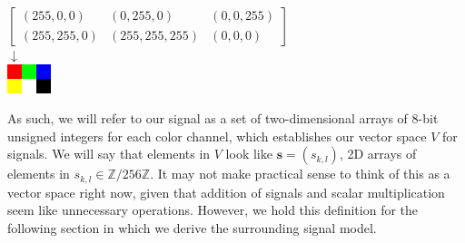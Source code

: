 \documentclass[12pt,technote]{IEEEtran}
\begin{document}
\begin{center}
    $\begin{bmatrix}
        (255, 0, 0) & (0, 255, 0) & (0, 0, 255)\\
        (255, 255, 0) & (255, 255, 255) & (0, 0, 0)
    \end{bmatrix}$\\
    $\downarrow$\\
    \includegraphics[width=0.5in]{figures/ppm_example.png}
\end{center}
As such, we will refer to our signal as a set of two-dimensional arrays of 8-bit unsigned integers for each color channel, which establishes our vector space $V$ for signals. We will say that elements in $V$ look like $\mathbf{s} = (s_{k,l})$, 2D arrays of elements in $s_{k,l}\in \mathbb{Z}/ 256\mathbb{Z}$. It may not make practical sense to think of this as a vector space right now, given that addition of signals and scalar multiplication seem like unnecessary operations. However, we hold this definition for the following section in which we derive the surrounding signal model.
\end{document}
